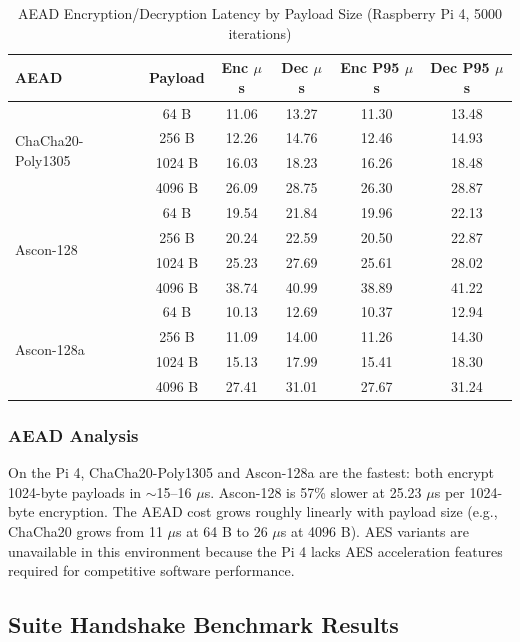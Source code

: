 \documentclass[conference]{IEEEtran}
\begin{document}
\begin{table}[htbp]
\centering
\caption{AEAD Encryption/Decryption Latency by Payload Size (Raspberry Pi 4, 5000 iterations)}
\begin{tabular}{lccccc}
\toprule
\textbf{AEAD} & \textbf{Payload} & \textbf{Enc $\mu$s} & \textbf{Dec $\mu$s} & \textbf{Enc P95 $\mu$s} & \textbf{Dec P95 $\mu$s} \\
\midrule
\multirow{4}{*}{ChaCha20-Poly1305} & 64 B & 11.06 & 13.27 & 11.30 & 13.48 \\
& 256 B & 12.26 & 14.76 & 12.46 & 14.93 \\
& 1024 B & 16.03 & 18.23 & 16.26 & 18.48 \\
& 4096 B & 26.09 & 28.75 & 26.30 & 28.87 \\
\midrule
\multirow{4}{*}{Ascon-128} & 64 B & 19.54 & 21.84 & 19.96 & 22.13 \\
& 256 B & 20.24 & 22.59 & 20.50 & 22.87 \\
& 1024 B & 25.23 & 27.69 & 25.61 & 28.02 \\
& 4096 B & 38.74 & 40.99 & 38.89 & 41.22 \\
\midrule
\multirow{4}{*}{Ascon-128a} & 64 B & 10.13 & 12.69 & 10.37 & 12.94 \\
& 256 B & 11.09 & 14.00 & 11.26 & 14.30 \\
& 1024 B & 15.13 & 17.99 & 15.41 & 18.30 \\
& 4096 B & 27.41 & 31.01 & 27.67 & 31.24 \\
\bottomrule
\end{tabular}
\end{table}

\subsubsection{AEAD Analysis}

On the Pi 4, ChaCha20-Poly1305 and Ascon-128a are the fastest: both encrypt 1024-byte payloads in $\sim$15–16 $\mu$s. Ascon-128 is 57\% slower at 25.23 $\mu$s per 1024-byte encryption. The AEAD cost grows roughly linearly with payload size (e.g., ChaCha20 grows from 11 $\mu$s at 64 B to 26 $\mu$s at 4096 B). AES variants are unavailable in this environment because the Pi 4 lacks AES acceleration features required for competitive software performance.

\subsection{Suite Handshake Benchmark Results}
\end{document}
